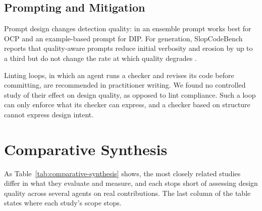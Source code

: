 \subsection{Prompting and Mitigation}

Prompt design changes detection quality: in \citet{pehlivan2025solid} an ensemble prompt works best
for OCP and an example-based prompt for DIP. For generation, SlopCodeBench reports that
quality-aware prompts reduce initial verbosity and erosion by up to a third but do not change the
rate at which quality degrades \citep{slopcodebench2026}.

Linting loops, in which an agent runs a checker and revises its code before committing, are
recommended in practitioner writing. We found no controlled study of their effect on design
quality, as opposed to lint compliance. Such a loop can only enforce what its checker can express, and a checker based on structure cannot
express design intent.

\section{Comparative Synthesis}
\label{sec:comparative-synthesis}

As Table~\ref{tab:comparative-synthesis} shows, the most closely related studies differ in what they
evaluate and measure, and each stops short of assessing design quality across several agents on real
contributions. The last column of the table states where each study's scope stops.

